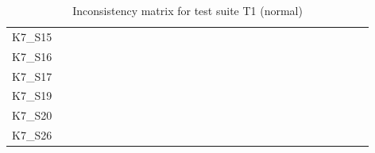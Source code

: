 \begin{table}[htpb]
\begin{tabular}{l|rrrrrrrrrrrrrrrrrrrrrrrrrrrr}
        K7\_S15 & \n & \n & \n & \n & \n & \n & \n & \n & \n & \n & \n & \n & \n & \n & \n & \n & \n & \n & \n & \n & \n & \n & \n & \n & \n & \n & \n & \n \\
        K7\_S16 & \n & \n & \n & \e & \n & \n & \n & \n & \n & \n & \n & \n & \n & \n & \n & \n & \n & \n & \n & \n & \n & \n & \n & \n & \n & \n & \n & \n \\
        K7\_S17 & \n & \n & \n & \n & \n & \n & \n & \n & \n & \n & \n & \n & \n & \n & \n & \n & \n & \n & \e & \n & \e & \n & \e & \e & \n & \n & \n & \n \\
        K7\_S19 & \n & \n & \n & \n & \n & \n & \n & \n & \n & \n & \n & \n & \n & \n & \n & \n & \n & \n & \n & \n & \n & \n & \n & \n & \n & \n & \n & \n \\
        K7\_S20 & \n & \n & \n & \n & \n & \n & \n & \n & \n & \n & \n & \n & \n & \n & \n & \n & \n & \n & \n & \n & \n & \n & \n & \n & \n & \n & \n & \n \\
        K7\_S26 & \n & \n & \n & \n & \n & \n & \n & \n & \n & \n & \n & \n & \n & \n & \n & \n & \n & \n & \n & \n & \n & \n & \n & \n & \n & \n & \n & \n \\
        \bottomrule
    \end{tabular}
    \caption{Inconsistency matrix for test suite T1 (normal)}
    \label{tab:inconsistencies_matrix_normal}
    \setlength{\tabcolsep}{\defaulttabcolsep}
\end{table}

